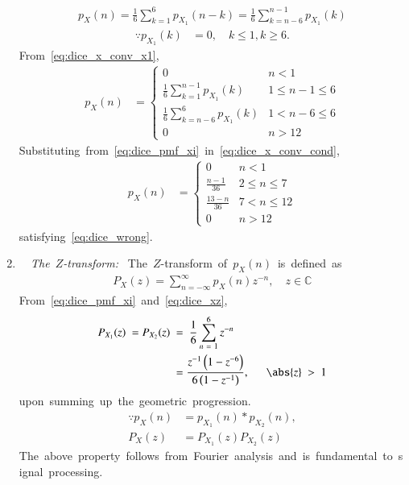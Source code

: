 \documentclass[journal,12pt,twocolumn]{IEEEtran}
\renewcommand\thesection{\arabic{section}}
\begin{document}
\begin{enumerate}[label=\thesection.\arabic*.,ref=\thesection.\theenumi]
\begin{align}
 p_X(n) = \frac{1}{6}\sum_{k=1}^{6}p_{X_1}(n-k)= \frac{1}{6}\sum_{k=n-6}^{n-1}p_{X_1}(k) 
 \label{eq:dice_x_conv_x1} 
 \end{align} 
 \begin{align} 
 \because p_{X_1}(k) &= 0, \quad k \le 1, k \ge 6. 
 \end{align} 
 From \eqref{eq:dice_x_conv_x1}, 
 \begin{align} 
 p_X(n) &=  
 \begin{cases} 
 0 & n < 1 
 \\ 
 \frac{1}{6}\sum_{k=1}^{n-1}p_{X_1}(k) &  1 \le n-1 \le  6 
 \\ 
 \frac{1}{6}\sum_{k=n-6}^{6}p_{X_1}(k) & 1 < n-6 \le 6 
 \\ 
 0 & n > 12 
 \end{cases} 
 \label{eq:dice_x_conv_cond} 
 \end{align} 
 Substituting from \eqref{eq:dice_pmf_xi} in \eqref{eq:dice_x_conv_cond}, 
 \begin{align} 
 p_X(n) &=  
 \begin{cases} 
 0 & n < 1 
 \\ 
 \frac{n-1}{36} &  2 \le n \le  7 
 \\ 
 \frac{13-n}{36} & 7 < n \le 12 
 \\ 
 0 & n > 12 
 \end{cases} 
 \label{eq:dice_x_conv_final} 
 \end{align} 
 satisfying \eqref{eq:dice_wrong}. 
 \item {\em The $Z$-transform: } 
 The $Z$-transform of $p_X(n)$ is defined as  
 \begin{align} 
 P_X(z) = \sum_{n = -\infty}^{\infty}p_X(n)z^{-n}, \quad z \in \mathbb{C} 
 \label{eq:dice_xz} 
 \end{align} 
 From \eqref{eq:dice_pmf_xi} and \eqref{eq:dice_xz},  
 \begin{align} 
 P_{X_1}(z) =P_{X_2}(z) &= \frac{1}{6}\sum_{n = 1}^{6}z^{-n} 
 \\ 
 &=\frac{z^{-1}\brak{1-z^{-6}}}{6\brak{1-z^{-1}}}, \quad \abs{z} > 1 
 \label{eq:dice_xiz} 
 \end{align} 
 upon summing up the geometric progression.   
 \begin{align} 
 \because p_X(n) &= p_{X_1}(n)*p_{X_2}(n), 
 \\ 
 P_X(z) &= P_{X_1}(z)P_{X_2}(z) 
 \label{eq:dice_xzprod_def} 
 \end{align} 
 The above property follows from Fourier analysis and is fundamental to signal processing.  

\end{enumerate}
\end{document}
